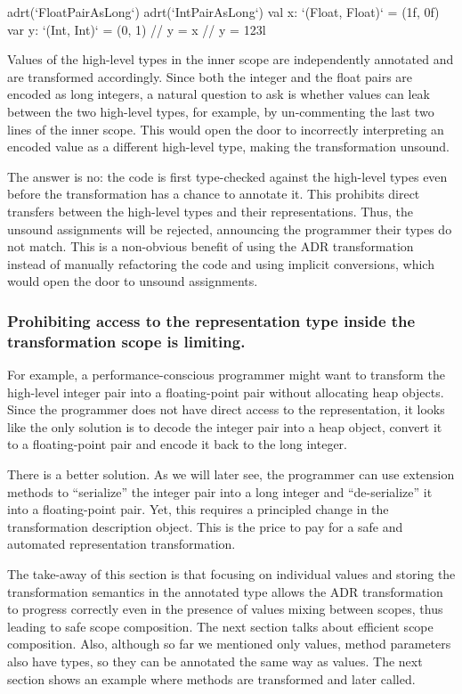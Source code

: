 \begin{lstlisting-nobreak}
adrt(`FloatPairAsLong`) {
  adrt(`IntPairAsLong`) {
    val x: `(Float, Float)` = (1f, 0f)
    var y: `(Int, Int)` = (0, 1)
    // y = x
    // y = 123l
  }
}
\end{lstlisting-nobreak}

Values of the high-level types in the inner scope are independently annotated and are transformed accordingly. Since both the integer and the float pairs are encoded as long integers, a natural question to ask is whether values can leak between the two high-level types, for example, by un-commenting the last two lines of the inner scope. This would open the door to incorrectly interpreting an encoded value as a different high-level type, making the transformation unsound.

The answer is no: the code is first type-checked against the high-level types even before the \inject{} transformation has a chance to annotate it. This prohibits direct transfers between the high-level types and their representations. Thus, the unsound assignments will be rejected, announcing the programmer their types do not match. This is a non-obvious benefit of using the ADR transformation instead of manually refactoring the code and using implicit conversions, which would open the door to unsound assignments.


\subsubsection{Prohibiting access to the representation type inside the transformation scope is limiting.} For example, a performance-conscious programmer might want to transform the high-level integer pair into a floating-point pair without allocating heap objects. Since the programmer does not have direct access to the representation, it looks like the only solution is to decode the integer pair into a heap object, convert it to a floating-point pair and encode it back to the long integer.

There is a better solution. As we will later see, the programmer can use extension methods to ``serialize'' the integer pair into a long integer and ``de-serialize'' it into a floating-point pair. Yet, this requires a principled change in the transformation description object. This is the price to pay for a safe and automated representation transformation.

The take-away of this section is that focusing on individual values and storing the transformation semantics in the annotated type allows the ADR transformation to progress correctly even in the presence of values mixing between scopes, thus leading to safe scope composition. The next section talks about efficient scope composition. Also, although so far we mentioned only values, method parameters also have types, so they can be annotated the same way as values. The next section shows an example where methods are transformed and later called.








